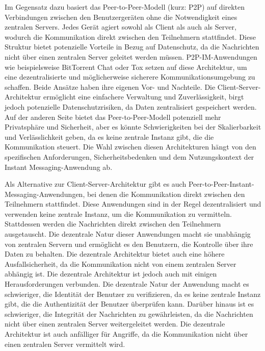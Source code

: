 Im Gegensatz dazu basiert das Peer-to-Peer-Modell (kurz: P2P) auf direkten Verbindungen zwischen den Benutzergeräten ohne die Notwendigkeit eines zentralen Servers. Jedes Gerät agiert sowohl als Client als auch als Server, wodurch die Kommunikation direkt zwischen den Teilnehmern stattfindet. Diese Struktur bietet potenzielle Vorteile in Bezug auf Datenschutz, da die Nachrichten nicht über einen zentralen Server geleitet werden müssen. P2P-IM-Anwendungen wie beispielsweise BitTorrent Chat oder Tox setzen auf diese Architektur, um eine dezentralisierte und möglicherweise sicherere Kommunikationsumgebung zu schaffen.
Beide Ansätze haben ihre eigenen Vor- und Nachteile. Die Client-Server-Architektur ermöglicht eine einfachere Verwaltung und Zuverlässigkeit, birgt jedoch potenzielle Datenschutzrisiken, da Daten zentralisiert gespeichert werden. Auf der anderen Seite bietet das Peer-to-Peer-Modell potenziell mehr Privatsphäre und Sicherheit, aber es könnte Schwierigkeiten bei der Skalierbarkeit und Verlässlichkeit geben, da es keine zentrale Instanz gibt, die die Kommunikation steuert. Die Wahl zwischen diesen Architekturen hängt von den spezifischen Anforderungen, Sicherheitsbedenken und dem Nutzungskontext der Instant Messaging-Anwendung ab.




Als Alternative zur Client-Server-Architektur gibt es auch Peer-to-Peer-Instant-\\Messaging-Anwendungen, bei denen die Kommunikation direkt zwischen den Teilnehmern stattfindet. Diese Anwendungen sind in der Regel dezentralisiert und verwenden keine zentrale Instanz, um die Kommunikation zu vermitteln. Stattdessen werden die Nachrichten direkt zwischen den Teilnehmern ausgetauscht. Die dezentrale Natur dieser Anwendungen macht sie unabhängig von zentralen Servern und ermöglicht es den Benutzern, die Kontrolle über ihre Daten zu behalten. Die dezentrale Architektur bietet auch eine höhere Ausfallsicherheit, da die Kommunikation nicht von einem zentralen Server abhängig ist. Die dezentrale Architektur ist jedoch auch mit einigen Herausforderungen verbunden. Die dezentrale Natur der Anwendung macht es schwieriger, die Identität der Benutzer zu verifizieren, da es keine zentrale Instanz gibt, die die Authentizität der Benutzer überprüfen kann. Darüber hinaus ist es schwieriger, die Integrität der Nachrichten zu gewährleisten, da die Nachrichten nicht über einen zentralen Server weitergeleitet werden. Die dezentrale Architektur ist auch anfälliger für Angriffe, da die Kommunikation nicht über einen zentralen Server vermittelt wird.